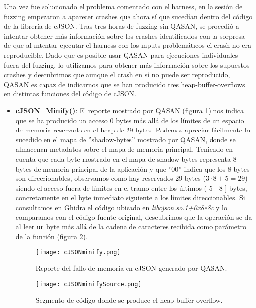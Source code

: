Una vez fue solucionado el problema comentado con el harness, en la sesión de fuzzing empezaron a aparecer crashes que ahora sí que sucedían dentro 
del código de la librería de cJSON. Tras tres horas de fuzzing sin QASAN, se procedió a intentar obtener más información sobre los crashes identificados con la 
sorpresa de que al intentar ejecutar el harness con los inputs problemáticos el crash no era reproducible. Dado que es posible usar QASAN para 
ejecuciones individuales fuera del fuzzing, lo utilizamos para obtener más información sobre los supuestos crashes y descubrimos que aunque el
crash en sí no puede ser reproducido, QASAN es capaz de indicarnos que se han producido tres heap-buffer-overflows en distintas funciones del código 
de cJSON.
\begin{itemize}
    \item \textbf{cJSON\_Minify()}: El reporte mostrado por QASAN (figura \ref{fig:cJSONminify}) nos indica que se ha producido un acceso 0 bytes más allá de los límites de un espacio
    de memoria reservado en el heap de 29 bytes. Podemos apreciar fácilmente lo sucedido en el mapa de ''shadow-bytes'' mostrado por QASAN, donde se 
    almacenan metadatos sobre el mapa de memoria principal. Teniendo en cuenta que cada byte mostrado en el mapa de shadow-bytes representa 8 bytes 
    de memoria principal de la aplicación y que ''00'' indica que los 8 bytes son direccionables, observamos como hay reservados 29 bytes ($3\cdot8 + 5=29$)
    siendo el acceso fuera de límites en el tramo entre los últimos ( 5 - 8 ] bytes, concretamente en el byte inmediato siguiente a los límites 
    direccionables. Si consultamos en Ghidra el código ubicado en \textit{libcjson.so.1+0x8e8c} y lo comparamos con el código fuente original, descubrimos
    que la operación se da al leer un byte más allá de la cadena de caracteres recibida como parámetro de la función (figura \ref{fig:cJSONminifySource}).
    \begin{figure}[H]
        \centering
        \texttt{[image: cJSONminify.png]}
        \caption{Reporte del fallo de memoria en cJSON generado por QASAN.}
        \label{fig:cJSONminify}
    \end{figure}

    \begin{figure}[H]
        \centering
        \texttt{[image: cJSONminifySource.png]}
        \caption{Segmento de código donde se produce el heap-buffer-overflow.}
        \label{fig:cJSONminifySource}
    \end{figure}


\end{itemize}
